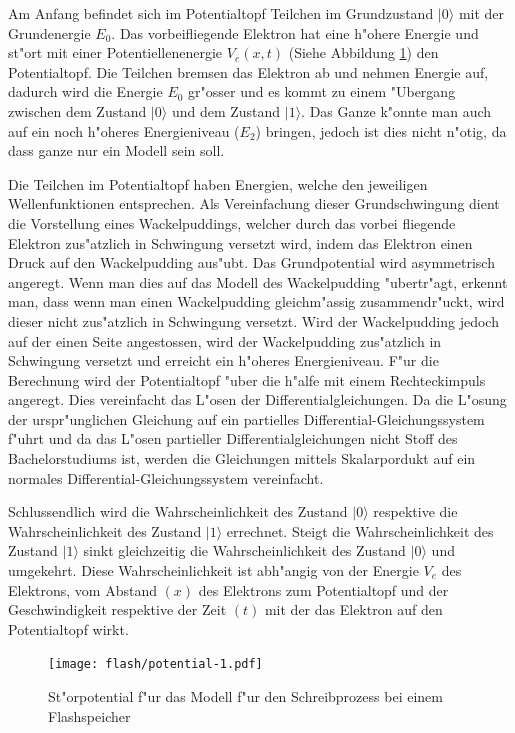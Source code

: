 \begin{refsection}
Am Anfang befindet sich im Potentialtopf Teilchen im Grundzustand $|0\rangle$
mit der Grundenergie $E_{0}$.
Das vorbeifliegende Elektron hat eine h"ohere Energie und st"ort mit
einer Potentiellenenergie $V_{e}(x,t)$ (Siehe Abbildung \ref{flash:Anregung})
den Potentialtopf.
Die Teilchen bremsen das Elektron ab und nehmen Energie auf, dadurch
wird die Energie $E_{0}$ gr"osser und es kommt zu einem "Ubergang 
zwischen dem Zustand $|0\rangle$ und dem Zustand $|1\rangle$.
Das Ganze k"onnte man auch auf ein noch h"oheres Energieniveau ($E_{2}$)
bringen, jedoch ist dies nicht n"otig, da dass ganze nur ein Modell
sein soll.

Die Teilchen im Potentialtopf haben Energien, welche den jeweiligen 
Wellenfunktionen entsprechen.
Als Vereinfachung dieser Grundschwingung dient die Vorstellung eines
Wackelpuddings, welcher durch das vorbei fliegende Elektron zus"atzlich
in Schwingung versetzt wird, indem das Elektron einen Druck auf den
Wackelpudding aus"ubt.
Das Grundpotential wird asymmetrisch angeregt.
Wenn man dies auf das Modell des Wackelpudding "ubertr"agt, erkennt man,
dass wenn man einen Wackelpudding gleichm"assig zusammendr"uckt, wird
dieser nicht zus"atzlich in Schwingung versetzt.
Wird der Wackelpudding jedoch auf der einen Seite angestossen, wird der
Wackelpudding zus"atzlich in Schwingung versetzt und erreicht ein
h"oheres Energieniveau.
F"ur die Berechnung wird der Potentialtopf "uber die h"alfe mit einem
Rechteckimpuls angeregt.
Dies vereinfacht das L"osen der Differentialgleichungen.
Da die L"osung der urspr"unglichen Gleichung auf ein partielles
Differential-Gleichungssystem f"uhrt und da das L"osen partieller
Differentialgleichungen nicht Stoff des Bachelorstudiums ist, werden
die Gleichungen mittels Skalarpordukt auf ein normales
Differential-Gleichungssystem vereinfacht.

Schlussendlich wird die Wahrscheinlichkeit des Zustand $|0\rangle$ 
respektive die Wahrscheinlichkeit des Zustand $|1\rangle$ errechnet.
Steigt die Wahrscheinlichkeit des Zustand $|1\rangle$ sinkt gleichzeitig
die Wahrscheinlichkeit des Zustand $|0\rangle$ und umgekehrt.
Diese Wahrscheinlichkeit ist abh"angig von der Energie $V_{e}$ 
des Elektrons, vom Abstand $(x)$ des Elektrons zum Potentialtopf und der 
Geschwindigkeit respektive der Zeit $(t)$ mit der das Elektron auf den 
Potentialtopf wirkt.

\begin{figure}
\centering
\texttt{[image: flash/potential-1.pdf]}
\caption{St"orpotential f"ur das Modell f"ur den Schreibprozess bei
einem Flashspeicher
\label{flash:Anregung}}
\end{figure}


\end{refsection}
